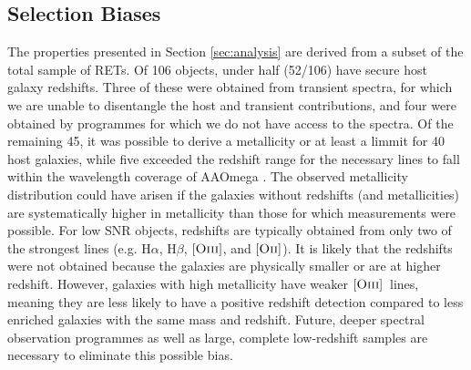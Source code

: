 \documentclass[fleqn,usenatbib,]{mnras}
\newcommand{\replylluis}[1]{\color{green}#1 \color{black}}
\newcommand{\halpha}[0]{H$\alpha$}
\newcommand{\hbeta}[0]{H$\beta$}
\newcommand{\OII}[0]{$[\textnormal{\textsc{Oii}}]$}
\newcommand{\OIII}[0]{$[\textnormal{\textsc{Oiii}}]$}
\begin{document}
\subsection{Selection Biases \label{subsec:disc_bias}}
The properties presented in Section \ref{sec:analysis} are derived from a subset of the total sample of RETs. Of 106 objects, under half \replylluis{(52/106)} have secure host galaxy redshifts. Three of these were obtained from transient spectra, for which we are unable to disentangle the host and transient contributions, and four were obtained by programmes for which we do not have access to the spectra. Of the remaining 45, it was possible to derive a metallicity \replylluis{or at least a limmit} for 40 host galaxies, \replylluis{while five exceeded the redshift range for the necessary lines to fall within the wavelength coverage of AAOmega}. The observed metallicity distribution could have arisen if the galaxies without redshifts (and metallicities) are systematically higher in metallicity than those for which measurements were possible. For low SNR objects, redshifts are typically obtained from only two of the strongest lines (e.g. \halpha, \hbeta, \OIII, and \OII). \replylluis{It is likely that the redshifts were not obtained because the galaxies are physically smaller or are at higher redshift. However, galaxies with high metallicity have weaker \OIII~lines, meaning they are less likely to have a positive redshift detection compared to less enriched galaxies with the same mass and redshift. Future, deeper spectral observation programmes as well as large, complete low-redshift samples are necessary to eliminate this possible bias.}
\end{document}
